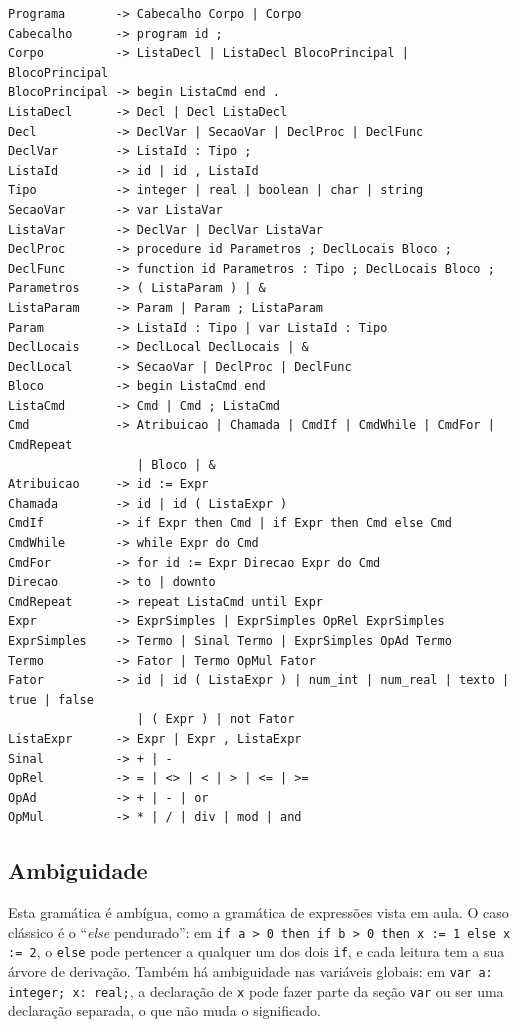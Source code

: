 \documentclass[12pt,a4paper]{article}
\newcommand{\fonte}[1][Elaborado pelos autores (2026).]{%
  \par\vspace{3pt}{\footnotesize Fonte: #1}\par}
\newcommand{\code}[1]{\texttt{#1}}
\begin{document}
\begin{quadro}[htbp]
\caption{GLC do miniPascal (arquivo \code{gramatica.txt})}\label{q:glc}
\begin{lstlisting}
Programa       -> Cabecalho Corpo | Corpo
Cabecalho      -> program id ;
Corpo          -> ListaDecl | ListaDecl BlocoPrincipal | BlocoPrincipal
BlocoPrincipal -> begin ListaCmd end .
ListaDecl      -> Decl | Decl ListaDecl
Decl           -> DeclVar | SecaoVar | DeclProc | DeclFunc
DeclVar        -> ListaId : Tipo ;
ListaId        -> id | id , ListaId
Tipo           -> integer | real | boolean | char | string
SecaoVar       -> var ListaVar
ListaVar       -> DeclVar | DeclVar ListaVar
DeclProc       -> procedure id Parametros ; DeclLocais Bloco ;
DeclFunc       -> function id Parametros : Tipo ; DeclLocais Bloco ;
Parametros     -> ( ListaParam ) | &
ListaParam     -> Param | Param ; ListaParam
Param          -> ListaId : Tipo | var ListaId : Tipo
DeclLocais     -> DeclLocal DeclLocais | &
DeclLocal      -> SecaoVar | DeclProc | DeclFunc
Bloco          -> begin ListaCmd end
ListaCmd       -> Cmd | Cmd ; ListaCmd
Cmd            -> Atribuicao | Chamada | CmdIf | CmdWhile | CmdFor | CmdRepeat
                  | Bloco | &
Atribuicao     -> id := Expr
Chamada        -> id | id ( ListaExpr )
CmdIf          -> if Expr then Cmd | if Expr then Cmd else Cmd
CmdWhile       -> while Expr do Cmd
CmdFor         -> for id := Expr Direcao Expr do Cmd
Direcao        -> to | downto
CmdRepeat      -> repeat ListaCmd until Expr
Expr           -> ExprSimples | ExprSimples OpRel ExprSimples
ExprSimples    -> Termo | Sinal Termo | ExprSimples OpAd Termo
Termo          -> Fator | Termo OpMul Fator
Fator          -> id | id ( ListaExpr ) | num_int | num_real | texto | true | false
                  | ( Expr ) | not Fator
ListaExpr      -> Expr | Expr , ListaExpr
Sinal          -> + | -
OpRel          -> = | <> | < | > | <= | >=
OpAd           -> + | - | or
OpMul          -> * | / | div | mod | and
\end{lstlisting}
\fonte
\end{quadro}

\subsection{Ambiguidade}

Esta gramática é ambígua, como a gramática de expressões vista em aula. O caso clássico é o
``\textit{else} pendurado'': em \code{if a > 0 then if b > 0 then x := 1 else x := 2}, o
\code{else} pode pertencer a qualquer um dos dois \code{if}, e cada leitura tem a sua árvore de
derivação. Também há ambiguidade nas variáveis globais: em \code{var a: integer; x: real;}, a
declaração de \code{x} pode fazer parte da seção \code{var} ou ser uma declaração separada, o que
não muda o significado.
\end{document}
